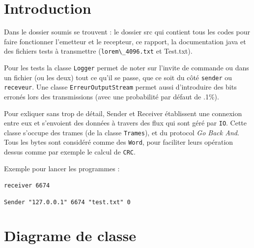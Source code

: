 \documentclass{article}
\begin{document}
\section{Introduction}

Dans le dossier soumis se trouvent : le dossier src qui contient tous les codes pour faire fonctionner l'emetteur et le recepteur, ce rapport, la documentation java et des fichiers tests à transmettre (\verb#lorem\_4096.txt# et Test.txt).

\hfill

Pour les tests la classe \verb#Logger# permet de noter sur l'invite de commande ou dans un fichier (ou les deux) tout ce qu'il se passe, que ce soit du côté \verb#sender# ou \verb#receveur#. Une classe \verb#ErreurOutputStream# permet aussi d'introduire des bits erronés lors des transmissions (avec une probabilité par défaut de .1\%).

\hfill

Pour exliquer sans trop de détail, Sender et Receiver établissent une connexion entre eux et s'envoient des données à travers des flux qui sont géré par \verb#IO#. Cette classe s'occupe des trames (de la classe \verb#Trames#), et du protocol \emph{Go Back And}. Tous les bytes sont considéré comme des \verb#Word#, pour faciliter leurs opération dessus comme par exemple le calcul de \verb#CRC#.

\hfill

\hfill

Exemple pour lancer les programmes :

\hfill

\verb#receiver 6674#

\hfill

\verb#Sender "127.0.0.1" 6674 "test.txt" 0#

\clearpage

\section{Diagrame de classe}
\end{document}
